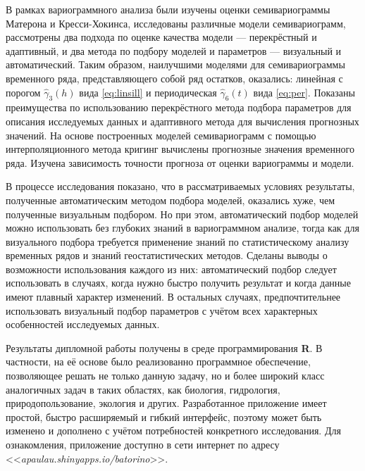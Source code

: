 В рамках вариограммного анализа были изучены оценки семивариограммы Матерона и Кресси-Хокинса, исследованы различные модели семивариограмм, рассмотрены два подхода по оценке качества модели --- перекрёстный и адаптивный, и два метода по подбору моделей и параметров --- визуальный и автоматический. Таким образом, наилучшими моделями для семивариограммы временного ряда, представляющего собой ряд остатков, оказались: линейная с порогом $ \widehat{\gamma}_3(h) $ вида \eqref{eq:linsill} и периодическая $\widehat{\gamma}_6(t) $ вида \eqref{eq:per}. Показаны преимущества по использованию перекрёстного метода подбора параметров для описания исследуемых данных и адаптивного метода для вычисления прогнозных значений. На основе построенных моделей семивариограмм с помощью интерполяционного метода кригинг вычислены прогнозные значения временного ряда. Изучена зависимость точности прогноза от оценки вариограммы и модели.

В процессе исследования показано, что в рассматриваемых условиях результаты, полученные автоматическим методом подбора моделей, оказались хуже, чем полученные визуальным подбором. Но при этом, автоматический подбор моделей можно использовать без глубоких знаний в вариограммном анализе, тогда как для визуального подбора требуется применение знаний по статистическому анализу временных рядов и знаний геостатистических методов. Сделаны выводы о возможности использования каждого из них: автоматический подбор следует использовать в случаях, когда нужно быстро получить результат и когда данные имеют плавный характер изменений. В остальных случаях, предпочтительнее использовать визуальный подбор параметров с учётом всех характерных особенностей исследуемых данных.

Результаты дипломной работы получены в среде программирования \textbf{R}. В частности, на её основе было реализованно программное обеспечение, позволяющее решать не только данную задачу, но и более широкий класс аналогичных задач в таких областях, как биология, гидрология, природопользование, экология и других. Разработанное приложение имеет простой, быстро расширяемый и гибкий интерфейс, поэтому может быть изменено и дополнено с учётом потребностей конкретного исследования. Для ознакомления, приложение доступно в сети интернет по адресу <<\textit{apaulau.shinyapps.io/batorino}>>.